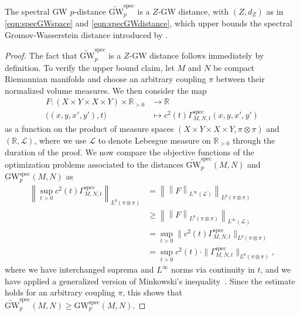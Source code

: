 \documentclass[twoside,11pt]{article}
\theoremstyle{definition}
\newcommand{\R}{\mathbb{R}}
\begin{document}
\begin{proposition}\label{prop:specGWasZGW}
    The spectral GW $p$-distance $\widetilde{\mathrm{GW}}_p^\mathrm{spec}$ is a $Z$-GW distance, with $(Z,d_Z)$ as in \eqref{eqn:specGWspace} and \eqref{eqn:specGWdistance}, which upper bounds the spectral Gromov-Wasserstein distance introduced by \citet{memoli2009spectral}.
\end{proposition}

\begin{proof}
    The fact that $\widetilde{\mathrm{GW}}_p^\mathrm{spec}$ is a $Z$-GW distance follows immediately by definition. To verify the upper bound claim, let $M$ and $N$ be compact Riemannian manifolds and choose an arbitrary coupling $\pi$ between their normalized volume measures. We then consider the map
    \begin{align}
    F: (X \times Y \times X \times Y) \times \R_{> 0} &\to \R \\
    \big((x,y,x',y'),t\big) &\mapsto c^2(t) \Gamma^\mathrm{spec}_{M,N,t}(x,y,x',y')
    \end{align}
    as a function on the product of measure spaces $(X \times Y \times X \times Y, \pi \otimes \pi)$ and $(\R,\mathcal{L})$, where we use $\mathcal{L}$ to denote Lebesgue measure on $\R_{>0}$ through the duration of the proof. We now compare the objective functions of the optimization problems associated to the distances $\widetilde{\mathrm{GW}}_p^\mathrm{spec}(M,N)$ and $\mathrm{GW}_p^\mathrm{spec}(M,N)$ as
    \begin{align}
     \left\|\sup_{t > 0} c^2 (t) \Gamma^{\mathrm{spec}}_{M,N,t} \right\|_{L^p(\pi \otimes \pi)} &= \left\| \left\|F\right\|_{L^\infty(\mathcal{L})} \right\|_{L^p(\pi \otimes \pi)} \\
     &\geq \left\| \left\|F\right\|_{L^p(\pi \otimes \pi)} \right\|_{L^\infty(\mathcal{L})} \\
     &= \sup_{t > 0} \|c^2(t) \Gamma_{M,N,t}^{\mathrm{spec}}\|_{L^p(\pi \otimes \pi)} \\
     &= \sup_{t > 0} c^2(t) \cdot \|\Gamma_{M,N,t}^{\mathrm{spec}}\|_{L^p(\pi \otimes \pi)},
    \end{align}
    where we have interchanged suprema and $L^\infty$ norms via continuity in $t$, and we have applied a generalized version of Minkowski's inequality~\citep[Proposition 1.3]{bahouri2011fourier}. Since the estimate holds for an arbitrary coupling $\pi$, this shows that $\widetilde{\mathrm{GW}}_p^\mathrm{spec}(M,N) \geq \mathrm{GW}_p^\mathrm{spec}(M,N)$.
\end{proof}
\end{document}
